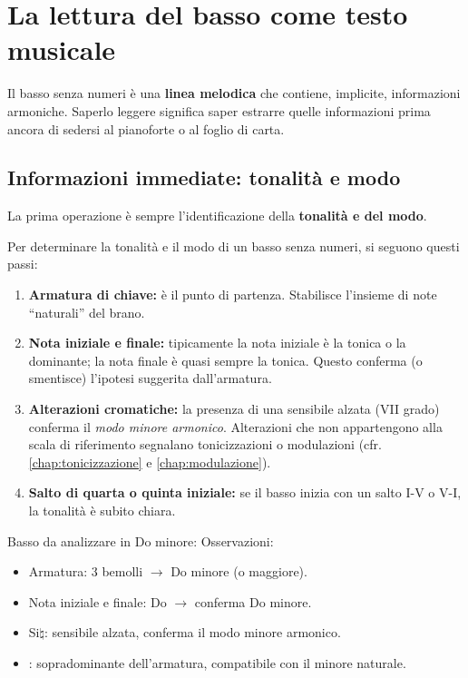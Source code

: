 \section{La lettura del basso come testo musicale}
\label{sec:lettura_basso}

Il basso senza numeri è una \textbf{linea melodica} che contiene, implicite, informazioni armoniche. Saperlo leggere significa saper estrarre quelle informazioni prima ancora di sedersi al pianoforte o al foglio di carta.

\subsection{Informazioni immediate: tonalità e modo}

La prima operazione è sempre l'identificazione della \textbf{tonalità e del modo}.

\begin{regola}
	\label{reg:identificazione_tonalita}
	Per determinare la tonalità e il modo di un basso senza numeri, si seguono questi passi:
	\begin{enumerate}
		\item \textbf{Armatura di chiave:} è il punto di partenza. Stabilisce l'insieme di note ``naturali'' del brano.
		\item \textbf{Nota iniziale e finale:} tipicamente la nota iniziale è la tonica o la dominante; la nota finale è quasi sempre la tonica. Questo conferma (o smentisce) l'ipotesi suggerita dall'armatura.
		\item \textbf{Alterazioni cromatiche:} la presenza di una sensibile alzata (VII grado) conferma il \textit{modo minore armonico}. Alterazioni che non appartengono alla scala di riferimento segnalano tonicizzazioni o modulazioni (cfr. \ref{chap:tonicizzazione} e \ref{chap:modulazione}).
		\item \textbf{Salto di quarta o quinta iniziale:} se il basso inizia con un salto I-V o V-I, la tonalità è subito chiara.
	\end{enumerate}
\end{regola}

\begin{esempio}
	\label{ex:identificazione_tonalita}
	Basso da analizzare in Do minore:
	Osservazioni:
	\begin{itemize}
		\item Armatura: 3 bemolli $\rightarrow$ Do minore (o \Mibemolle  maggiore).
		\item Nota iniziale e finale: Do $\rightarrow$ conferma Do minore.
		\item Si$\natural$: sensibile alzata, conferma il modo minore armonico.
		\item \Labemolle : sopradominante dell'armatura, compatibile con il minore naturale.
	\end{itemize}
\end{esempio}

